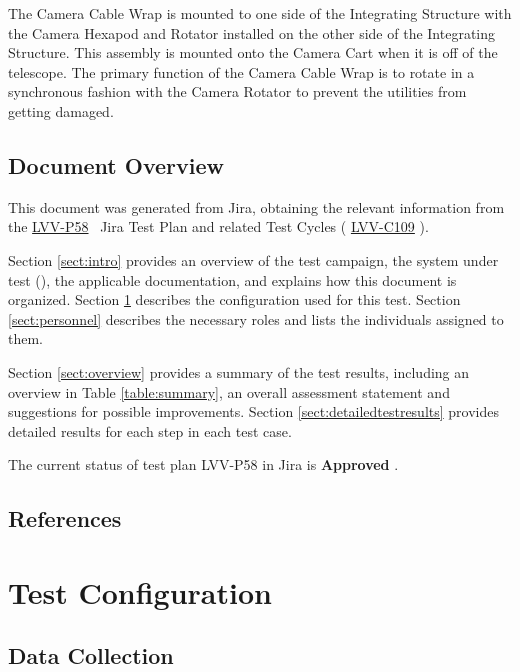 \documentclass[SE,lsstdraft,STR,toc]{lsstdoc}
\begin{document}
The Camera Cable Wrap is mounted to one side of the Integrating
Structure with the Camera Hexapod and Rotator installed on the other
side of the Integrating Structure. This assembly is mounted onto the
Camera Cart when it is off of the telescope. The primary function of the
Camera Cable Wrap is to rotate in a synchronous fashion with the Camera
Rotator to prevent the utilities from getting damaged.


\subsection{Document Overview}
\label{sect:docoverview}

This document was generated from Jira, obtaining the relevant information from the 
\href{https://jira.lsstcorp.org/secure/Tests.jspa#/testPlan/LVV-P58}{LVV-P58}
~Jira Test Plan and related Test Cycles (
  \href{https://jira.lsstcorp.org/secure/Tests.jspa#/testCycle/LVV-C109}{LVV-C109}
).

Section \ref{sect:intro} provides an overview of the test campaign, the system under test (\product{}), the applicable documentation, and explains how this document is organized.
Section \ref{sect:configuration}  describes the configuration used for this test.
Section \ref{sect:personnel} describes the necessary roles and lists the individuals assigned to them.

Section \ref{sect:overview} provides a summary of the test results, including an overview in Table \ref{table:summary}, an overall assessment statement and suggestions for possible improvements.
Section \ref{sect:detailedtestresults} provides detailed results for each step in each test case.

The current status of test plan LVV-P58 in Jira is \textbf{ Approved }.

\subsection{References}
\label{sect:references}
\renewcommand{\refname}{}

\section{Test Configuration}
\label{sect:configuration}

\subsection{Data Collection}
\end{document}
